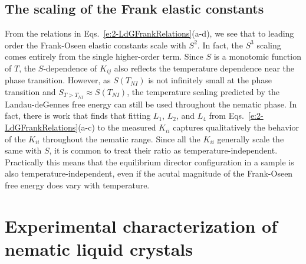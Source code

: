 \subsection{The scaling of the Frank elastic constants}
From the relations in Eqs.~\ref{e:2-LdGFrankRelations}(a-d), we see that to leading order the Frank-Oseen elastic constants scale with $S^2$.
In fact, the $S^3$ scaling comes entirely from the single higher-order term.
Since $S$ is a monotomic function of $T$, the $S$-dependence of $K_{ij}$ also reflects the temperature dependence near the phase transition.
However, as $S(T_{NI})$ is not infinitely small at the phase transition and $S_{T > T_{NI}} \approx S(T_{NI})$, the temperature scaling predicted by the Landau-deGennes free energy can still be used throughout the nematic phase.
In fact, there is work that finds that fitting $L_1$, $L_2$, and $L_4$ from Eqs.~\ref{e:2-LdGFrankRelations}(a-c) to the measured $K_{ii}$ captures qualitatively the behavior of the $K_{ii}$ throughout the nematic range.
Since all the $K_{ii}$ generally scale the same with $S$, it is common to treat their ratio as temperature-independent.
Practically this means that the equilibrium director configuration in a sample is also temperature-independent, even if the acutal magnitude of the Frank-Oseen free energy does vary with temperature.




\section{Experimental characterization of nematic liquid crystals}
